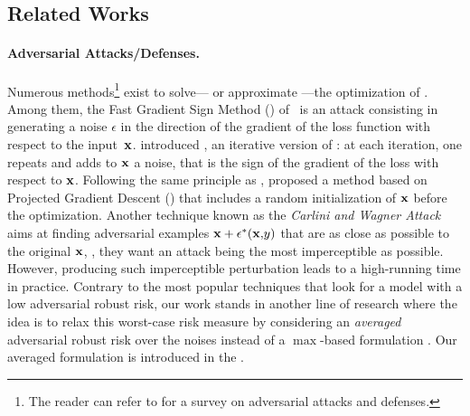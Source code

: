 \subsection{Related Works}
\label{chap:mv-robustness:related-works}

\paragraph{Adversarial Attacks/Defenses.} 
Numerous methods\footnote{The reader can refer to \citet{RenZhengQinLiu2020} for a survey on adversarial attacks and defenses.} exist to solve--- or approximate ---the optimization of .
Among them, the Fast Gradient Sign Method (\FGSM) of~\citet{GoodfellowShlensSzegedy2015} is an attack consisting in generating a noise $\epsilon$ in the direction of the gradient of the loss function with respect to the \mbox{input $\mathbf{x}$}.
\citet{KurakinGoodfellowBengio2017}  introduced \IFGSM, an iterative version of \FGSM: at each iteration, one repeats \FGSM and adds to $\mathbf{x}$ a noise, that is the sign of the gradient of the loss with respect to $\mathbf{x}$.
Following the same principle as \IFGSM, \citet{MadryMakelovSchmidtTsiprasVladu2018} proposed a method based on Projected Gradient Descent (\PGD) that includes a random initialization of $\mathbf{x}$ before the optimization.
Another technique known as the {\it Carlini and Wagner Attack}~\citep{CarliniWagner2017} aims at finding adversarial examples $\mathbf{x}+\epsilon^*(\mathbf{x}{,}y)$ that are as close as possible to the original $\mathbf{x}$, \ie, they want an attack being the most imperceptible as possible. 
However, producing such imperceptible perturbation leads to a high-running time in practice.
Contrary to the most popular techniques that look for a model with a low adversarial robust risk, our work stands in another line of research where the idea is to relax this  worst-case risk measure by considering an {\it averaged} adversarial robust risk over the noises instead of a  $\max$-based formulation \citep[see, \eg,][]{ZantedeschiNicolaeRawat2017,HendrycksDietterich2019}. 
Our averaged formulation is introduced in the .

